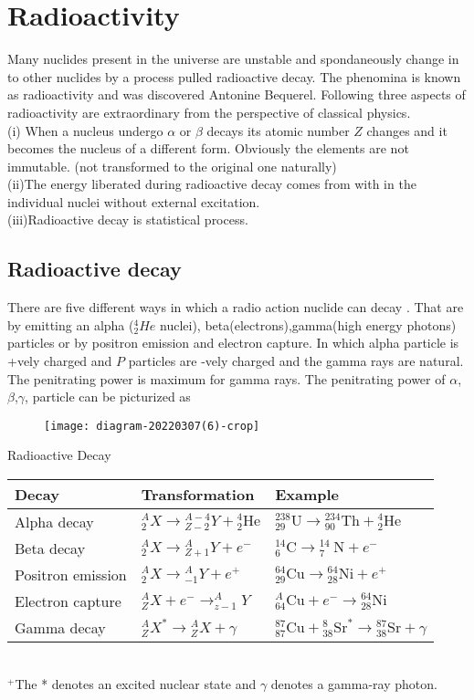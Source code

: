 \section{Radioactivity}
Many nuclides present in the universe are unstable and spondaneously change in to other nuclides by a process pulled radioactive decay. The phenomina is known as radioactivity and was discovered Antonine Bequerel. Following three aspects of radioactivity are extraordinary from the perspective of classical physics.\\
(i) \quad When a nucleus undergo $\alpha$ or $\beta$ decays its atomic number $Z$ changes and it becomes the nucleus of a different form. Obviously the elements are not immutable. (not transformed to the original one naturally)\\
(ii)\quad The energy liberated during radioactive decay comes from with in the individual nuclei without external excitation.\\
(iii)\quad Radioactive decay is statistical process.
\subsection{Radioactive decay}
There are five different ways in which a radio action nuclide can decay . That are by emitting an alpha ($ ^4_2He$ nuclei), beta(electrons),gamma(high energy photons) particles or by positron emission  and electron capture. In which alpha particle is +vely charged and $P$ particles are -vely charged and the gamma rays are natural. The penitrating power is maximum for  gamma rays. The penitrating power of $\alpha$,$\beta$,$\gamma$, particle can be picturized as\\
\begin{figure}[H]
	\centering
	\texttt{[image: diagram-20220307(6)-crop]}
	\caption{}
	\label{}
\end{figure}
 Radioactive Decay\\
\begin{tabular}{lll}
	\hline Decay & Transformation & Example \\
	\hline Alpha decay & ${ }_{2}^{A} X \rightarrow{ }_{Z-2}^{A-4} Y+{ }_{2}^{4} \mathrm{He}$ & ${ }_{29}^{238} \mathrm{U} \rightarrow{ }_{90}^{234} \mathrm{Th}+{ }_{2}^{4} \mathrm{He}$ \\
	Beta decay & ${ }_{2}^{A} X \rightarrow{ }_{Z+1}^{A} Y+e^{-}$ & ${ }_{6}^{14} \mathrm{C} \rightarrow{ }_{7}^{14} \mathrm{~N}+e^{-}$ \\
	Positron emission & ${ }_{2}^{A} X \rightarrow{ }_{-1}^{A} Y+e^{+}$ & ${ }_{29}^{64} \mathrm{Cu} \rightarrow{ }_{28}^{64} \mathrm{Ni}+e^{+}$ \\
	Electron capture & ${ }_{Z}^{A} X+e^{-} \rightarrow_{z-1}^{A} Y$ & ${ }_{64}^{A} \mathrm{Cu}+e^{-} \rightarrow{ }_{28}^{64} \mathrm{Ni}$ \\
	Gamma decay & ${ }_{Z}^{A} X^{*} \rightarrow{ }_{Z}^{A} X+\gamma$ & ${ }_{87}^{87} \mathrm{Cu}+{ }_{38}^{8} \mathrm{Sr}^{*} \rightarrow{ }_{38}^{87} \mathrm{Sr}+\gamma$ \\
	\hline
\end{tabular}\\
${ }^{+}$The * denotes an excited nuclear state and $\gamma$ denotes a gamma-ray photon.
